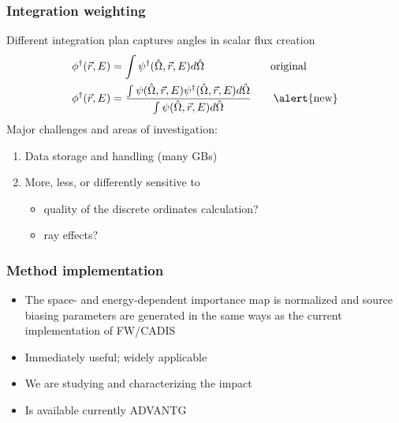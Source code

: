 \documentclass[xcolor=x11names,compress]{beamer}
\renewcommand{\(}{\begin{columns}}
\renewcommand{\)}{\end{columns}}
\newcommand{\<}[1]{\begin{column}{#1}}
\renewcommand{\>}{\end{column}}
\newcommand{\vOmega}{\ensuremath{\hat{\Omega}}}
\newcommand{\ve}[1]{\ensuremath{\vec{#1}}}
\begin{document}
\begin{frame}[fragile]
  \frametitle{Integration weighting}

    Different integration plan captures angles in scalar flux creation	
	\begin{align*}
		\phi^{\dagger}(\ve{r},E) &= \int \psi^{\dagger}(\vOmega, 
		\ve{r},E) d\vOmega \qquad  \qquad \qquad \text{original}\\
		\phi^{\dagger}(\ve{r},E) &= \frac{\int \psi(\vOmega, \ve{r},E)
		 \psi^{\dagger}(\vOmega, \ve{r},E) d\vOmega}{\int \psi(\vOmega, 
		 \ve{r},E)  d\vOmega} \qquad \text{\alert{new}}
	\end{align*}
    \pause
    Major challenges and areas of investigation:
	\begin{enumerate}
	\item Data storage and handling (many GBs)
	\item More, less, or differently sensitive to 
	  \begin{itemize}
	  \item quality of the discrete ordinates calculation?
	  \item ray effects?
	  \end{itemize}
	\end{enumerate}

\end{frame}


\begin{frame}[fragile]
  \frametitle{Method implementation}

  	\begin{itemize}
    \item The space- and energy-dependent importance map is normalized and 
     source biasing parameters are generated in the \alert{same ways} as
     the current implementation of FW/CADIS \vspace*{1 em}
	\item Immediately useful; widely applicable \vspace*{1 em}
	\item We are studying and characterizing the impact\vspace*{1 em}
	\item Is available currently ADVANTG \cite{mosher_new_2010}
	\end{itemize}
	
\end{frame}
\end{document}
